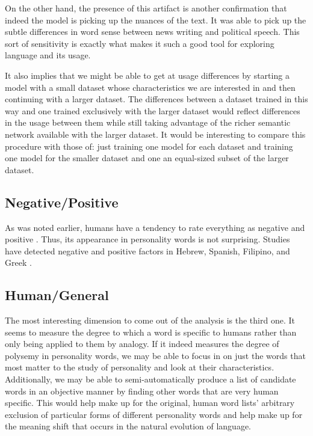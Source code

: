 \documentclass[eric_thesis.tex]{subfiles}
\begin{document}
On the other hand, the presence of this artifact is another confirmation that
indeed the model is picking up the nuances of the text. It was able to pick up
the subtle differences in word sense between news writing and political speech.
This sort of sensitivity is exactly what makes it such a good tool for exploring
language and its usage.

It also implies that we might be able to get at usage differences by starting a
model with a small dataset whose characteristics we are interested in and then
continuing with a larger dataset. The differences between a dataset trained in
this way and one trained exclusively with the larger dataset would reflect 
differences in the usage between them while still taking advantage of the richer
semantic network available with the larger dataset. It would be interesting to
compare this procedure with those of: just training one model for each dataset
and training one model for the smaller dataset and one an equal-sized subset of
the larger dataset.

\subsection{Negative/Positive}

As was noted earlier, humans have a tendency to rate everything as negative and
positive \citep{Samsonovich2010}. Thus, its appearance in personality words
is not surprising. Studies have detected negative and positive factors
in Hebrew, Spanish, Filipino, and Greek \citep[p. 134]{DeRaad2009}. 

\subsection{Human/General}

The most interesting dimension to come out of the analysis is the third one.
It seems to measure the degree to which a word is specific to humans rather than
only being applied to them by analogy. 
If it indeed measures the degree of polysemy in personality words, we may be 
able to focus in on just the words that most matter to the study of personality
and look at their characteristics. Additionally, we may be able to 
semi-automatically produce a list of candidate words in an objective manner by
finding other words that are very human specific. This would help make up for
the original, human word lists' arbitrary exclusion of particular forms of 
different
personality words and help make up for the meaning shift that occurs in the 
natural evolution of language.
\end{document}
